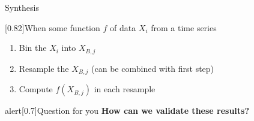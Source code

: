 \begin{frame}{Synthesis}
    \begin{varblock*}{}[0.82\textwidth]{When some function $f$ of data $X_i$ from a time series}
        \begin{enumerate}
        \item Bin the $X_i$ into $X_{B,j}$
        \item Resample the $X_{B,j}$ (can be combined with first step)
        \item Compute $f(X_{B,j})$ in each resample
        \end{enumerate}
    \end{varblock*}
    \begin{center}
    \end{center}
    \vspace{-3mm}
    \begin{varblock}{alert}[0.7\textwidth]{Question for you}
        \large\textbf{How can we validate these results?}
    \end{varblock}
\end{frame}
